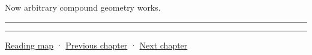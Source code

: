 Now arbitrary compound geometry works.

\begin{center}\rule{0.5\linewidth}{0.5pt}\end{center}

\begin{center}\rule{0.5\linewidth}{0.5pt}\end{center}

\href{Chapter\%20Edition/03\%20-\%20Game\%20Engine/00\%20-\%20Reading\%20Map}{Reading map} · \hyperref[06-engine-ii-ch034]{Previous chapter} · \hyperref[06-engine-ii-ch036]{Next chapter}

